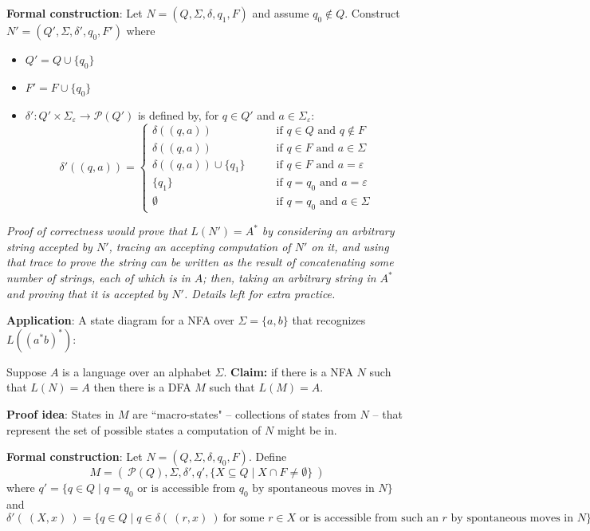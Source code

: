 \documentclass[12pt, oneside]{article}
\begin{document}
{\bf Formal construction}: Let 
$N = (Q, \Sigma, \delta, q_1, F)$ and assume $q_0 \notin Q$.
Construct $N' = (Q', \Sigma, \delta', q_0, F')$ where
\begin{itemize}
    \item $Q' = Q \cup \{q_0\}$
    \item $F' = F \cup \{q_0\}$
    \item $\delta': Q' \times \Sigma_\varepsilon \to \mathcal{P}(Q')$ is defined by, for $q \in Q'$ and $a \in \Sigma_{\varepsilon}$:
        \[
            \delta'((q,a))=\begin{cases}  
                \delta ((q,a)) &\qquad\text{if } q\in Q \textrm{ and } q \notin F\\ 
                \delta ((q,a)) &\qquad\text{if } q\in F \textrm{ and } a \in \Sigma\\ 
                \delta ((q,a)) \cup \{q_1\} &\qquad\text{if } q\in F \textrm{ and } a = \varepsilon\\ 
                \{q_1\} &\qquad\text{if } q = q_0 \textrm{ and } a = \varepsilon \\
                \emptyset &\qquad\text{if } q = q_0 \textrm { and } a \in \Sigma
            \end{cases}
        \]
\end{itemize}


{\it Proof of correctness would prove that $L(N') = A^*$ by considering
an arbitrary string accepted by $N'$, tracing an accepting computation of $N'$ on it, and using 
that trace to prove the string can be written as the result of concatenating some number of strings, 
each of which is in $A$; then, taking an arbitrary 
string in $A^*$ and proving that it is accepted by $N'$. Details left for extra practice.}


{\bf Application}: A state diagram for a NFA over $\Sigma = \{a,b\}$ 
that recognizes $L (( a^*b)^* )$:

\vfill
\newpage
Suppose $A$ is a language over an alphabet $\Sigma$.
{\bf Claim:} if there is a NFA $N$ such that $L(N) = A$ then 
there is a DFA $M$ such that $L(M) = A$.

{\bf Proof idea}: States in $M$ are ``macro-states" -- collections of states from $N$ -- 
that represent the set of possible states a computation of $N$ might be in.


{\bf Formal construction}: Let $N = (Q, \Sigma, \delta, q_0, F)$.  Define 
\[
M = (~ \mathcal{P}(Q), \Sigma, \delta', q',  \{ X \subseteq Q \mid X \cap F \neq \emptyset \}~ )
\]
where $q' = \{ q \in Q \mid \text{$q = q_0$ or is accessible from $q_0$ by spontaneous moves in $N$} \}$
and 
\[
    \delta' (~(X, x)~) = \{ q \in Q \mid q \in \delta( ~(r,x)~) ~\text{for some $r \in X$ or is accessible 
from such an $r$ by spontaneous moves in $N$} \}
\]
\end{document}
